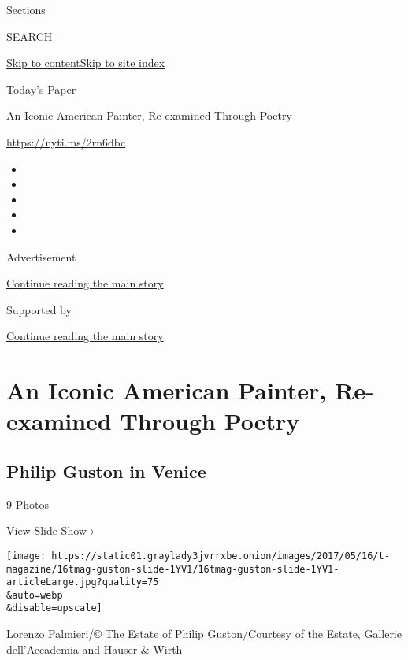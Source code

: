 Sections

SEARCH

\protect\hyperlink{site-content}{Skip to
content}\protect\hyperlink{site-index}{Skip to site index}

\href{https://myaccount.nytimes3xbfgragh.onion/auth/login?response_type=cookie\&client_id=vi}{}

\href{https://www.nytimes3xbfgragh.onion/section/todayspaper}{Today's
Paper}

An Iconic American Painter, Re-examined Through Poetry

\url{https://nyti.ms/2rn6dbc}

\begin{itemize}
\item
\item
\item
\item
\item
\end{itemize}

Advertisement

\protect\hyperlink{after-top}{Continue reading the main story}

Supported by

\protect\hyperlink{after-sponsor}{Continue reading the main story}

\hypertarget{an-iconic-american-painter-re-examined-through-poetry}{%
\section{An Iconic American Painter, Re-examined Through
Poetry}\label{an-iconic-american-painter-re-examined-through-poetry}}

\href{https://www.nytimes3xbfgragh.onion/slideshow/2017/05/16/t-magazine/philip-guston-in-venice.html}{}

\hypertarget{philip-guston-in-venice}{%
\subsection{Philip Guston in Venice}\label{philip-guston-in-venice}}

9 Photos

View Slide Show ›

\texttt{[image: https://static01.graylady3jvrrxbe.onion/images/2017/05/16/t-magazine/16tmag-guston-slide-1YV1/16tmag-guston-slide-1YV1-articleLarge.jpg?quality=75\\\&auto=webp\\\&disable=upscale]}

Lorenzo Palmieri/© The Estate of Philip Guston/Courtesy of the Estate,
Gallerie dell'Accademia and Hauser \& Wirth


